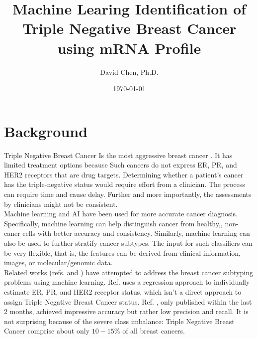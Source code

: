\documentclass[11pt]{diazessay}
\title{\Large \textbf{Machine Learing Identification of Triple Negative Breast Cancer using mRNA Profile}}
\author{David Chen, Ph.D.}
\date{\today}
\begin{document}
\maketitle



\section{Background}

Triple Negative Breast Cancer Is the most aggressive breast cancer . It has limited treatment options because Such cancers do not express ER, PR, and HER2 receptors that are drug targets. Determining whether a patient's cancer has the triple-negative status would require effort from a clinician. The process can require time and cause delay. Further and more importantly, the assessments by clinicians might not be consistent. \\

Machine learning and AI have been used for more accurate cancer diagnosis. Specifically, machine learning can help distinguish cancer from healthy,, non-caner cells with better accuracy and consistency. Similarly, machine learning can also be used to further stratify cancer subtypes. The input for such classifiers can be very flexible, that is, the features can be derived from clinical information, images, or molecular/genomic data. \\

Related works (refs.\cite{lehmann2011} and \cite{wu2021}) have attempted to address the breast cancer subtyping problems using machine learning. Ref.\cite{lehmann2011} uses a regression approach to individually estimate  ER, PR, and HER2 receptor status, which isn't a direct approach to assign Triple Negative Breast Cancer status. Ref. \cite{wu2021}, only published within the last 2 months, achieved impressive accuracy but rather low precision and recall. It is not surprising because of the severe class imbalance: Triple Negative Breast Cancer comprise about only $10-15\%$ of all breast cancers. \\
\end{document}
